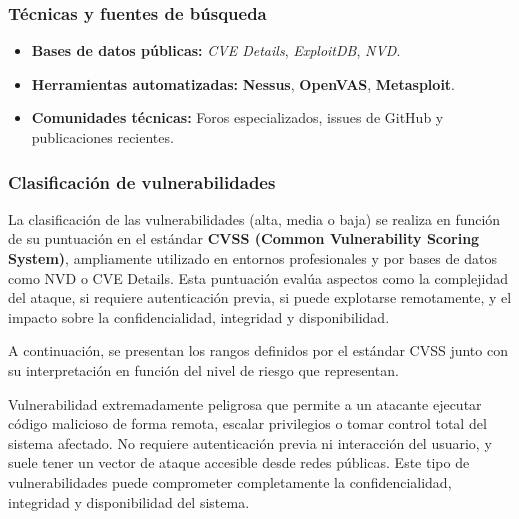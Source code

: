 \documentclass[a4paper, 11pt]{article}
\begin{document}
\vspace{0.5cm}
\subsubsection*{Técnicas y fuentes de búsqueda}

\begin{itemize}
    \item \textbf{Bases de datos públicas:} \textit{CVE Details}, \textit{ExploitDB}, \textit{NVD}.
    \item \textbf{Herramientas automatizadas:} \textbf{Nessus}, \textbf{OpenVAS}, \textbf{Metasploit}.
    \item \textbf{Comunidades técnicas:} Foros especializados, issues de GitHub y publicaciones recientes.
\end{itemize}

\vspace{0.5cm}

\subsubsection{Clasificación de vulnerabilidades}

La clasificación de las vulnerabilidades (alta, media o baja) se realiza en función de su puntuación en el estándar \textbf{CVSS (Common Vulnerability Scoring System)}, ampliamente utilizado en entornos profesionales y por bases de datos como NVD o CVE Details. Esta puntuación evalúa aspectos como la complejidad del ataque, si requiere autenticación previa, si puede explotarse remotamente, y el impacto sobre la confidencialidad, integridad y disponibilidad. \cite{cvss}
\vspace{0.5cm}

A continuación, se presentan los rangos definidos por el estándar CVSS junto con su interpretación en función del nivel de riesgo que representan.

\vspace{0.5cm}

\begin{tcolorbox}[colback=cvsscritical!10, colframe=cvsscritical!80!black, coltitle=white,
    title=Crítica (CVSS 9.0 -- 10.0)]
Vulnerabilidad extremadamente peligrosa que permite a un atacante ejecutar código malicioso de forma remota, escalar privilegios o tomar control total del sistema afectado. No requiere autenticación previa ni interacción del usuario, y suele tener un vector de ataque accesible desde redes públicas. Este tipo de vulnerabilidades puede comprometer completamente la confidencialidad, integridad y disponibilidad del sistema.
\end{tcolorbox}
\end{document}
